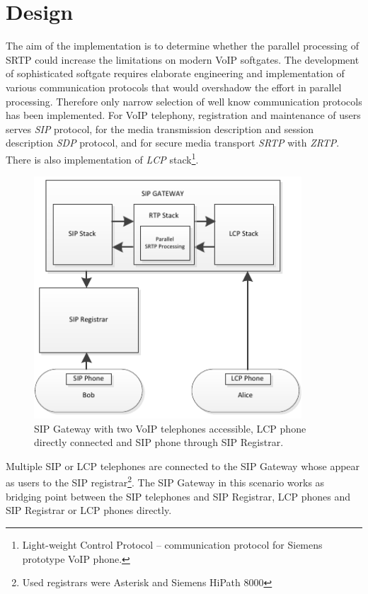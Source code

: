 \chapter{Design}\label{chapter:design}%
The aim of the implementation is to determine whether the parallel processing
of SRTP could increase the limitations on modern VoIP softgates. The development
of sophisticated softgate requires elaborate engineering and implementation
of various communication protocols that would overshadow the effort in parallel
processing. Therefore only narrow selection of well know communication protocols
has been implemented. For VoIP telephony, registration and maintenance of users
serves \textit{SIP} protocol, for the media transmission description
and session description \textit{SDP} protocol, and for secure media transport 
\textit{SRTP} with \textit{ZRTP}. There is also implementation of \textit{LCP} 
stack\footnote{ Light-weight Control Protocol -- communication protocol for
Siemens prototype VoIP phone.}.



\begin{figure}[H]
\centering
\includegraphics[width=10cm]{fig/scenario1.pdf}
\caption{SIP Gateway with two VoIP telephones accessible, LCP phone directly 
connected and SIP phone through SIP Registrar.}
\label{oclpm}
\end{figure}

Multiple SIP or LCP telephones are connected to the SIP Gateway whose appear as
users to the SIP registrar\footnote{ Used registrars were Asterisk and Siemens 
HiPath 8000}. The SIP Gateway in this scenario works as bridging point between 
the SIP telephones and SIP Registrar, LCP phones and SIP Registrar or LCP phones
directly.

